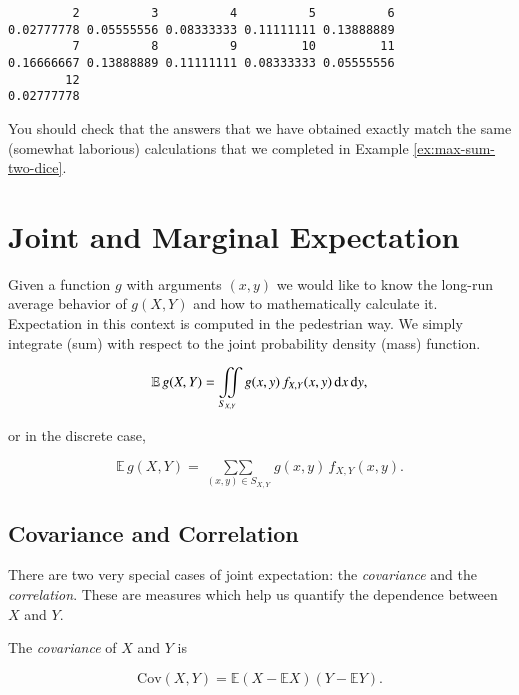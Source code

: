 \documentclass[]{book}
\numberwithin{equation}{chapter}
\numberwithin{figure}{chapter}
\theoremstyle{plain}
\theoremstyle{definition}
\theoremstyle{remark}
\theoremstyle{definition}
\theoremstyle{definition}
\theoremstyle{remark}
\let\BeginKnitrBlock\begin \let\EndKnitrBlock\end
\begin{document}
\begin{verbatim}
         2          3          4          5          6 
0.02777778 0.05555556 0.08333333 0.11111111 0.13888889 
         7          8          9         10         11 
0.16666667 0.13888889 0.11111111 0.08333333 0.05555556 
        12 
0.02777778 
\end{verbatim}

You should check that the answers that we have obtained exactly match
the same (somewhat laborious) calculations that we completed in Example
\ref{ex:max-sum-two-dice}.

\section{Joint and Marginal
Expectation}\label{sec-joint-and-marginal-expectation}

Given a function \(g\) with arguments \((x,y)\) we would like to know
the long-run average behavior of \(g(X,Y)\) and how to mathematically
calculate it. Expectation in this context is computed in the pedestrian
way. We simply integrate (sum) with respect to the joint probability
density (mass) function.

\begin{equation}
\mathbb{E}\, g(X,Y)=\iintop_{S_{X,Y}}g(x,y)\, f_{X,Y}(x,y)\,\mathrm{d} x\,\mathrm{d} y,
\end{equation}

or in the discrete case,

\begin{equation}
\mathbb{E}\, g(X,Y)=\mathop{\sum\sum}\limits _{(x,y)\in S_{X,Y}}g(x,y)\, f_{X,Y}(x,y).
\end{equation}

\subsection{Covariance and
Correlation}\label{covariance-and-correlation}

There are two very special cases of joint expectation: the
\emph{covariance} and the \emph{correlation}. These are measures which
help us quantify the dependence between \(X\) and \(Y\).

\bigskip

\BeginKnitrBlock{definition}
\protect\hypertarget{def:unnamed-chunk-201}{}{\label{def:unnamed-chunk-201}}The
\emph{covariance} of \(X\) and \(Y\) is

\begin{equation}
\mbox{Cov}(X,Y)=\mathbb{E}(X-\mathbb{E} X)(Y-\mathbb{E} Y).
\end{equation}
\EndKnitrBlock{definition}
\end{document}
